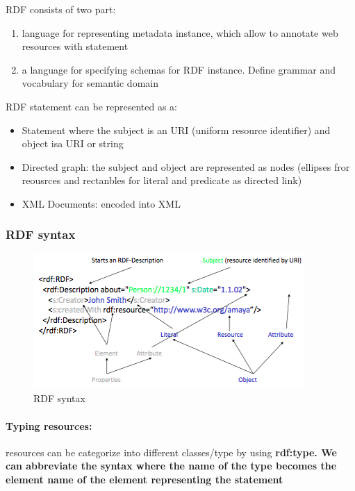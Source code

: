 RDF consists of two part:
\begin{enumerate}
\item language for representing metadata instance, which allow to annotate web resources with statement
\item a language for specifying schemas for RDF instance. Define grammar and vocabulary for semantic domain
\end{enumerate}

RDF statement can be represented as a:
\begin{itemize}
\item Statement where the subject is an URI (uniform resource identifier) and object isa URI or string
\item Directed graph: the subject and object are represented as nodes (ellipses fror reousrces and rectanbles for literal and predicate as directed link)
\item XML Documents: encoded into XML
\end{itemize}

\subsubsection{RDF syntax}
\begin{figure}[H]
\begin{center}
\includegraphics[width=\textwidth]{figures/rdf.png}
\end{center}
\caption{RDF syntax}
\end{figure}

\paragraph{Typing resources:} resources can be categorize into different classes/type by using \bf{rdf:type}. We can abbreviate the syntax where the name of the type becomes the element name of the element representing the statement

